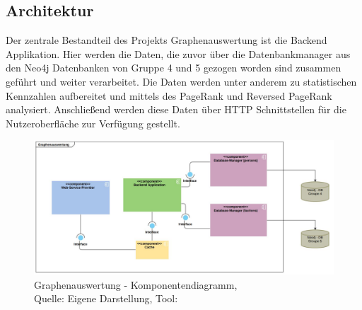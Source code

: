 \subsection{Architektur}
Der zentrale Bestandteil des Projekts Graphenauswertung ist die Backend Applikation. Hier werden die Daten, die zuvor über die Datenbankmanager aus den Neo4j Datenbanken von Gruppe 4 und 5 gezogen worden sind zusammen geführt und weiter verarbeitet. Die Daten werden unter anderem zu statistischen Kennzahlen aufbereitet und mittels des PageRank und Reversed PageRank analysiert. Anschließend werden diese Daten über HTTP Schnittstellen für die Nutzeroberfläche zur Verfügung gestellt.
\begin{figure}[H]
	\centering
	\includegraphics[width=450px, keepaspectratio]{logos/graphenauswertung_architektur.JPG}
	\caption{Graphenauswertung - Komponentendiagramm,\\Quelle: Eigene Darstellung, Tool: \cite{visual_paradigm}}
\end{figure}
